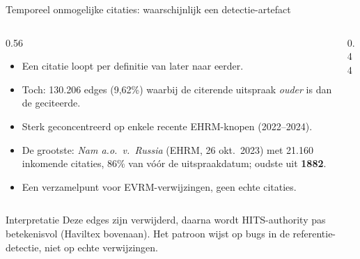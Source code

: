 \documentclass[aspectratio=169,11pt]{beamer}
\newcommand{\rd}[1]{\textcolor{uvared}{#1}}
\begin{document}
\begin{frame}{Temporeel onmogelijke citaties: waarschijnlijk een detectie-artefact}
  \footnotesize
  \begin{columns}[T]
    \begin{column}{0.56\textwidth}
      \begin{itemize}
        \item Een citatie loopt per definitie van \rd{later} naar \rd{eerder}.
        \item Toch: \rd{130.206 edges (9,62\%)} waarbij de citerende uitspraak \emph{ouder} is dan de geciteerde.
        \item Sterk geconcentreerd op enkele recente \rd{EHRM}-knopen (2022--2024).
        \item De grootste: \emph{Nam a.o.\ v.\ Russia} (EHRM, 26 okt.\ 2023) met 21.160 inkomende citaties, \rd{86\% van v\'o\'or} de uitspraakdatum; oudste uit \textbf{1882}.
        \item Een \rd{verzamelpunt} voor EVRM-verwijzingen, geen echte citaties.
      \end{itemize}
    \end{column}
    \begin{column}{0.44\textwidth}
      \centering
    \end{column}
  \end{columns}
  \vspace{0.3em}
  \begin{block}{Interpretatie}
    Deze edges zijn verwijderd, daarna wordt HITS-authority pas betekenisvol (Haviltex bovenaan). Het patroon wijst op \rd{bugs in de referentie-detectie}, niet op echte verwijzingen.
  \end{block}
\end{frame}
\end{document}
